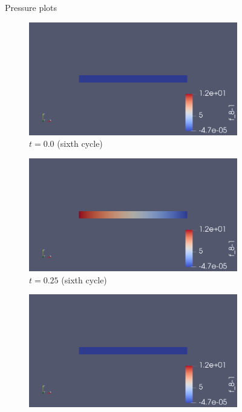 \documentclass{article}
\begin{document}
\begin{figure}[ht] 
\centering Pressure plots
  \begin{subfigure}[b]{0.5\linewidth}      
    \centering    
    \includegraphics[width=1\linewidth]{pressure_time_0.png} 
    \caption{$t=0.0$ (sixth cycle)} 
    \label{fig7:a} 
    \vspace{4ex}
  \end{subfigure}%
  \begin{subfigure}[b]{0.5\linewidth}
    \centering
    \includegraphics[width=1\linewidth]{pressure_time_025.png} 
    \caption{$t=0.25$ (sixth cycle)} 
    \label{fig7:b} 
    \vspace{4ex}
    \end{subfigure} 
  \begin{subfigure}[b]{0.5\linewidth}
    \centering
    \includegraphics[width=1\linewidth]{pressure_time_050.png} 

\end{subfigure}
\end{figure}
\end{document}
